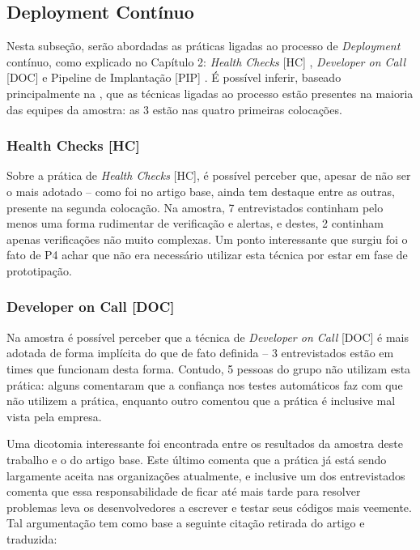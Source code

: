 \subsection{Deployment Contínuo}

Nesta subseção, serão abordadas as práticas ligadas ao processo de \emph{Deployment} contínuo, como explicado no Capítulo 2: \emph{Health Checks} [HC] \cite{devopsBook}, \emph{Developer on Call} [DOC] \cite{devAndDeploymentFB} e Pipeline de Implantação [PIP] \cite{devopsBook}. É possível inferir, baseado principalmente na , que as técnicas ligadas ao processo estão presentes na maioria das equipes da amostra: as 3 estão nas quatro primeiras colocações. 

\subsubsection{Health Checks [HC]}

Sobre a prática de \emph{Health Checks} [HC], é possível perceber que, apesar de não ser o mais adotado -- como foi no artigo base, ainda tem destaque entre as outras, presente na segunda colocação. Na amostra, 7 entrevistados continham pelo menos uma forma rudimentar de verificação e alertas, e destes, 2 continham apenas verificações não muito complexas. Um ponto interessante que surgiu foi o fato de P4 achar que não era necessário utilizar esta técnica por estar em fase de prototipação.

\subsubsection{Developer on Call [DOC]}

Na amostra é possível perceber que a técnica de \emph{Developer on Call} [DOC] é mais adotada de forma implícita do que de fato definida -- 3 entrevistados estão em times que funcionam desta forma. Contudo, 5 pessoas do grupo não utilizam esta prática: alguns comentaram que a confiança nos testes automáticos faz com que não utilizem a prática, enquanto outro comentou que a prática é inclusive mal vista pela empresa.

Uma dicotomia interessante foi encontrada entre os resultados da amostra deste trabalho e o do artigo base. Este último comenta que a prática já está sendo largamente aceita nas organizações atualmente, e inclusive um dos entrevistados comenta que essa responsabilidade de ficar até mais tarde para resolver problemas leva os desenvolvedores a escrever e testar seus códigos mais veemente. Tal argumentação tem como base a seguinte citação retirada do artigo e traduzida:

